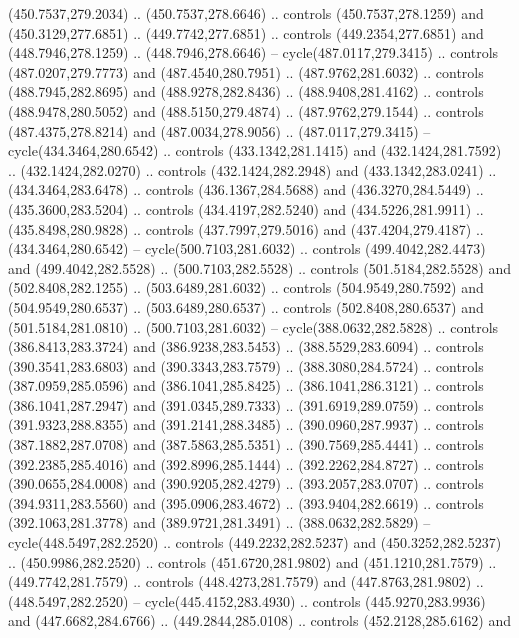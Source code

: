 \begin{scope}[cm={{1.25,0.0,0.0,-1.25,(0.0,743.43331)}}]
    (450.7537,279.2034) .. (450.7537,278.6646) .. controls (450.7537,278.1259) and
    (450.3129,277.6851) .. (449.7742,277.6851) .. controls (449.2354,277.6851) and
    (448.7946,278.1259) .. (448.7946,278.6646) -- cycle(487.0117,279.3415) ..
    controls (487.0207,279.7773) and (487.4540,280.7951) .. (487.9762,281.6032) ..
    controls (488.7945,282.8695) and (488.9278,282.8436) .. (488.9408,281.4162) ..
    controls (488.9478,280.5052) and (488.5150,279.4874) .. (487.9762,279.1544) ..
    controls (487.4375,278.8214) and (487.0034,278.9056) .. (487.0117,279.3415) --
    cycle(434.3464,280.6542) .. controls (433.1342,281.1415) and
    (432.1424,281.7592) .. (432.1424,282.0270) .. controls (432.1424,282.2948) and
    (433.1342,283.0241) .. (434.3464,283.6478) .. controls (436.1367,284.5688) and
    (436.3270,284.5449) .. (435.3600,283.5204) .. controls (434.4197,282.5240) and
    (434.5226,281.9911) .. (435.8498,280.9828) .. controls (437.7997,279.5016) and
    (437.4204,279.4187) .. (434.3464,280.6542) -- cycle(500.7103,281.6032) ..
    controls (499.4042,282.4473) and (499.4042,282.5528) .. (500.7103,282.5528) ..
    controls (501.5184,282.5528) and (502.8408,282.1255) .. (503.6489,281.6032) ..
    controls (504.9549,280.7592) and (504.9549,280.6537) .. (503.6489,280.6537) ..
    controls (502.8408,280.6537) and (501.5184,281.0810) .. (500.7103,281.6032) --
    cycle(388.0632,282.5828) .. controls (386.8413,283.3724) and
    (386.9238,283.5453) .. (388.5529,283.6094) .. controls (390.3541,283.6803) and
    (390.3343,283.7579) .. (388.3080,284.5724) .. controls (387.0959,285.0596) and
    (386.1041,285.8425) .. (386.1041,286.3121) .. controls (386.1041,287.2947) and
    (391.0345,289.7333) .. (391.6919,289.0759) .. controls (391.9323,288.8355) and
    (391.2141,288.3485) .. (390.0960,287.9937) .. controls (387.1882,287.0708) and
    (387.5863,285.5351) .. (390.7569,285.4441) .. controls (392.2385,285.4016) and
    (392.8996,285.1444) .. (392.2262,284.8727) .. controls (390.0655,284.0008) and
    (390.9205,282.4279) .. (393.2057,283.0707) .. controls (394.9311,283.5560) and
    (395.0906,283.4672) .. (393.9404,282.6619) .. controls (392.1063,281.3778) and
    (389.9721,281.3491) .. (388.0632,282.5829) -- cycle(448.5497,282.2520) ..
    controls (449.2232,282.5237) and (450.3252,282.5237) .. (450.9986,282.2520) ..
    controls (451.6720,281.9802) and (451.1210,281.7579) .. (449.7742,281.7579) ..
    controls (448.4273,281.7579) and (447.8763,281.9802) .. (448.5497,282.2520) --
    cycle(445.4152,283.4930) .. controls (445.9270,283.9936) and
    (447.6682,284.6766) .. (449.2844,285.0108) .. controls (452.2128,285.6162) and

\end{scope}
